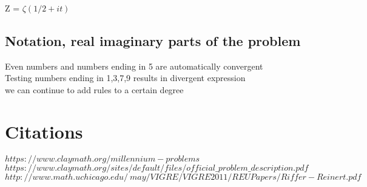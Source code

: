 \documentclass[11pt]{article}
\begin{document}
Z = $\zeta(1/2 + it)$

\subsection{Notation, real imaginary parts of the problem}
Even numbers and numbers ending in 5 are automatically convergent\\
Testing numbers ending in 1,3,7,9 results in divergent expression\\
we can continue to add rules to a certain degree


\newpage
\section*{Citations}
\rbrack \hspace{1mm} $ https://www.claymath.org/millennium-problems$\\
\rbrack \hspace{1mm} $ https://www.claymath.org/sites/default/files/official\_problem\_description.pdf$
 \rbrack \hspace{1mm} $http://www.math.uchicago.edu/~may/VIGRE/VIGRE2011/REUPapers/Riffer-Reinert.pdf$
\end{document}
